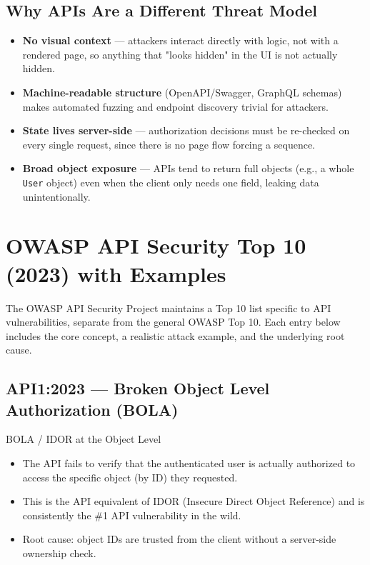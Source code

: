 \documentclass[11pt]{article}
\begin{document}
\subsection{Why APIs Are a Different Threat Model}
\begin{itemize}
  \item \textbf{No visual context} --- attackers interact directly with logic, not with a rendered page, so anything that "looks hidden" in the UI is not actually hidden.
  \item \textbf{Machine-readable structure} (OpenAPI/Swagger, GraphQL schemas) makes automated fuzzing and endpoint discovery trivial for attackers.
  \item \textbf{State lives server-side} --- authorization decisions must be re-checked on every single request, since there is no page flow forcing a sequence.
  \item \textbf{Broad object exposure} --- APIs tend to return full objects (e.g., a whole \texttt{User} object) even when the client only needs one field, leaking data unintentionally.
\end{itemize}

\newpage
\section{OWASP API Security Top 10 (2023) with Examples}

The OWASP API Security Project maintains a Top 10 list specific to API vulnerabilities, separate from the general OWASP Top 10. Each entry below includes the core concept, a realistic attack example, and the underlying root cause.

\subsection{API1:2023 --- Broken Object Level Authorization (BOLA)}
\begin{vulnbox}{BOLA / IDOR at the Object Level}
\begin{itemize}
  \item The API fails to verify that the authenticated user is actually authorized to access the specific object (by ID) they requested.
  \item This is the API equivalent of IDOR (Insecure Direct Object Reference) and is consistently the \#1 API vulnerability in the wild.
  \item Root cause: object IDs are trusted from the client without a server-side ownership check.
\end{itemize}
\end{vulnbox}
\end{document}
